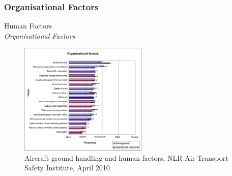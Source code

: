 \subsubsection{Organisational Factors}
\begin{frame}{Human Factors\\\textit{Organisational Factors}}{}
	\begin{figure}[H]
	\centering
	\includegraphics[width=230px]{Grafik/OrganisationalFactors}
	\caption{\footnotesize Aircraft ground handling and human factors, NLR Air Transport Safety Institute, April 2010}
\end{figure}
\end{frame}